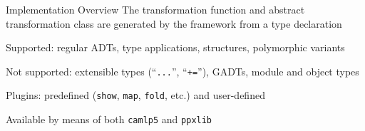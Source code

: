 \documentclass{beamer}
\theoremstyle{definition}
\theoremstyle{plain} %
\begin{document}
\begin{comment}
  Before starting to show-off the examples, we summarize here the implementation details:

  1. Our framework generates the generic transformation function and abstract transformation class for a wide range
  of practically important kinds of type definitions.

  2. Moreover, our framework is equipped with a plugin system, which additionally allows to generate a number of
  concrete transformation classes, implementing transformations, which generally considered useful (like \lstinline|show|, etc.)
  Again, all these implementations reuse the single generic transformation function. It is interesting that, due to
  a very generic shape of transformation, chosen from the very beginning, it turned out to be possible to express some
  transformations, which have to be implemented in an ad hoc manner in other frameworks (for example, \lstinline|compare|
  and \lstinline|eq|).
 
  3. The plugin subsystem is available for an end user~--- it is possible to add a custom plugin, which will be
  dynamically loaded along with the standard ones. Due to the general design choices, the implementation of a plugin is
  easy~--- there is no need to traverse the type definition or to generate a transformation function. A plugin is only
  responsible for generation of methods-per-constructor bodies.

  4. The framework is available both in terms of \lstinline|ppxlib| and \lstinline|camlp5| syntax extension.  
\end{comment}

\begin{frame}[fragile]{Implementation Overview}
  The transformation function and abstract transformation class are generated by the framework from a type declaration
  \vskip5mm
  
  Supported: regular ADTs, type applications, structures, polymorphic variants
  \vskip5mm
  
  Not supported: extensible types (``\lstinline|...|'', ``\lstinline{+=}''), GADTs, module and object types
  \vskip5mm

  Plugins: predefined (\lstinline[basicstyle=\large]|show|, \lstinline[basicstyle=\large]|map|, \lstinline[basicstyle=\large]|fold|, etc.) and user-defined
  \vskip5mm

  Available by means of both \lstinline[basicstyle=\large]|camlp5| and \lstinline[basicstyle=\large]|ppxlib|  
\end{frame}
\end{document}
